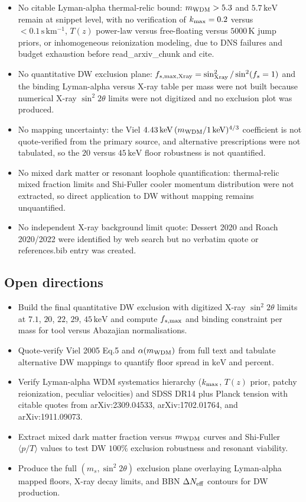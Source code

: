 \documentclass[11pt,a4paper]{article}
\begin{document}
\begin{itemize}
  \item No citable Lyman-alpha thermal-relic bound: $m_{\rm WDM} > 5.3$ and $5.7\,\mathrm{keV}$ remain at snippet level, with no verification of $k_{\rm max} = 0.2$ versus $<0.1\,\mathrm{s\,km^{-1}}$, $T(z)$ power-law versus free-floating versus $5000\,\mathrm{K}$ jump priors, or inhomogeneous reionization modeling, due to DNS failures and budget exhaustion before read\_arxiv\_chunk and cite.
  \item No quantitative DW exclusion plane: $f_{s,{\rm max,Xray}} = \sin^2_{\rm Xray}/\sin^2(f_s=1)$ and the binding Lyman-alpha versus X-ray table per mass were not built because numerical X-ray $\sin^2 2\theta$ limits were not digitized and no exclusion plot was produced.
  \item No mapping uncertainty: the Viel $4.43\,\mathrm{keV}\,(m_{\rm WDM}/1\,\mathrm{keV})^{4/3}$ coefficient is not quote-verified from the primary source, and alternative prescriptions were not tabulated, so the $20$ versus $45\,\mathrm{keV}$ floor robustness is not quantified.
  \item No mixed dark matter or resonant loophole quantification: thermal-relic mixed fraction limits and Shi-Fuller cooler momentum distribution were not extracted, so direct application to DW without mapping remains unquantified.
  \item No independent X-ray background limit quote: Dessert 2020 and Roach 2020/2022 were identified by web search but no verbatim quote or references.bib entry was created.
\end{itemize}
\subsection{Open directions}
\begin{itemize}
  \item Build the final quantitative DW exclusion with digitized X-ray $\sin^2 2\theta$ limits at $7.1$, $20$, $22$, $29$, $45\,\mathrm{keV}$ and compute $f_{s,{\rm max}}$ and binding constraint per mass for tool versus Abazajian normalisations.
  \item Quote-verify Viel 2005 Eq.5 and $\alpha(m_{\rm WDM})$ from full text and tabulate alternative DW mappings to quantify floor spread in $\mathrm{keV}$ and percent.
  \item Verify Lyman-alpha WDM systematics hierarchy ($k_{\rm max}$, $T(z)$ prior, patchy reionization, peculiar velocities) and SDSS DR14 plus Planck tension with citable quotes from arXiv:2309.04533, arXiv:1702.01764, and arXiv:1911.09073.
  \item Extract mixed dark matter fraction versus $m_{\rm WDM}$ curves and Shi-Fuller $\langle p/T \rangle$ values to test DW $100\%$ exclusion robustness and resonant viability.
  \item Produce the full $(m_s, \sin^2 2\theta)$ exclusion plane overlaying Lyman-alpha mapped floors, X-ray decay limits, and BBN $\Delta N_{\rm eff}$ contours for DW production.
\end{itemize}
\end{document}
